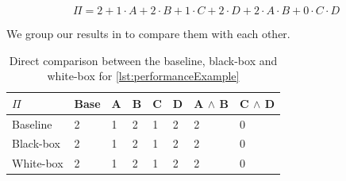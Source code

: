 \begin{equation}
    \Pi = 2 + 1 \cdot A + 2 \cdot B + 1 \cdot C + 2 \cdot D + 2 \cdot A \cdot B + 0 \cdot C \cdot D
\end{equation}

We group our results in to compare them with each other.

\begin{table}[H]
    \centering
    \begin{tabular}{llllllll}
    \hline
    $\Pi$    & Base & A & B & C & D & A $\land$ B & C $\land$ D  \\ \hline
    Baseline & 2    & 1 & 2 & 1 & 2 & 2           & 0            \\
    Black-box & 2    & 1 & 2 & 1 & 2 & 2           & 0           \\
    White-box & 2    & 1 & 2 & 1 & 2 & 2           & 0           \\ \hline
    \end{tabular}  
    \caption{Direct comparison between the baseline, black-box and white-box {\perfInfluenceModel} for \autoref{lst:performanceExample}}
\end{table}